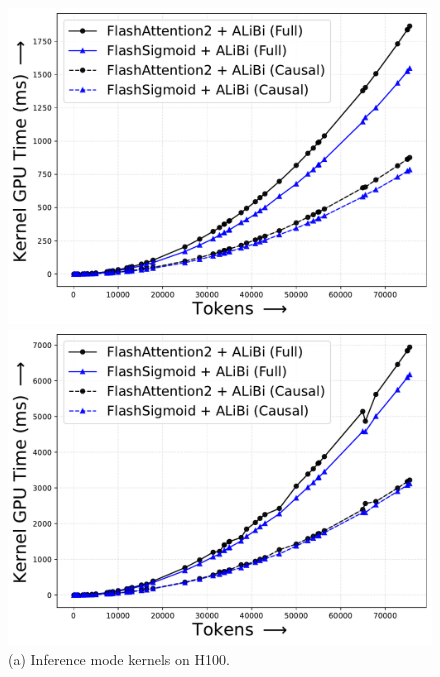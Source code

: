 \begin{figure}[!htbp]
    \centering
    \begin{minipage}{0.46\textwidth}
        \footnotesize
        \centering
        \includegraphics[trim={0 0 0 0}, width=\textwidth]{figures/_flash_figures/final_arxiv/f4/h100/H100_alibi_FWD_Full_17.04_0.04_Causal_10.87_0.24.pdf}
        \captionsetup{justification=centering}
        \caption*{
            (a) Inference mode kernels on H100. 
        }
    \end{minipage}
    \hfill
    \begin{minipage}{0.46\textwidth}
        \centering        
        \includegraphics[trim={0 0 0 0}, width=\textwidth]{figures/_flash_figures/final_arxiv/f4/h100/H100_alibi_FWDBWD_Full_8.91_0.05_Causal_4.72_0.1.pdf}

\end{minipage}
\end{figure}
